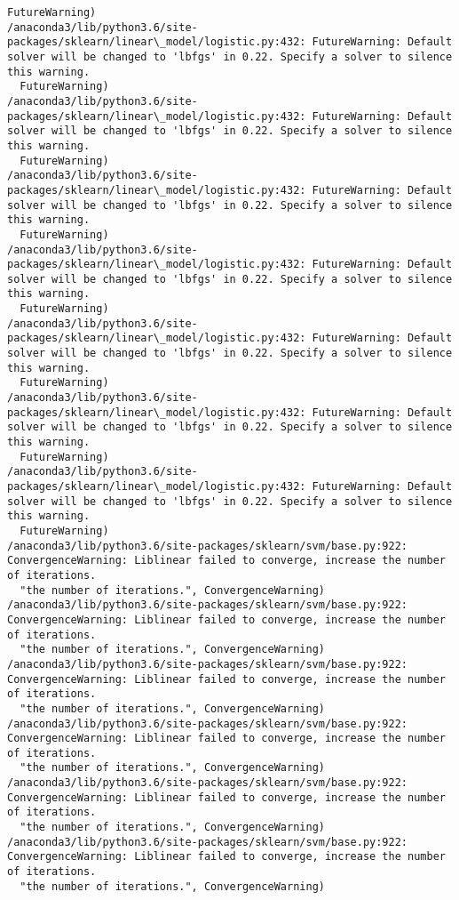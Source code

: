 \documentclass[11pt]{article}
\begin{document}
\begin{Verbatim}[commandchars=\\\{\}]
  FutureWarning)
/anaconda3/lib/python3.6/site-packages/sklearn/linear\_model/logistic.py:432: FutureWarning: Default solver will be changed to 'lbfgs' in 0.22. Specify a solver to silence this warning.
  FutureWarning)
/anaconda3/lib/python3.6/site-packages/sklearn/linear\_model/logistic.py:432: FutureWarning: Default solver will be changed to 'lbfgs' in 0.22. Specify a solver to silence this warning.
  FutureWarning)
/anaconda3/lib/python3.6/site-packages/sklearn/linear\_model/logistic.py:432: FutureWarning: Default solver will be changed to 'lbfgs' in 0.22. Specify a solver to silence this warning.
  FutureWarning)
/anaconda3/lib/python3.6/site-packages/sklearn/linear\_model/logistic.py:432: FutureWarning: Default solver will be changed to 'lbfgs' in 0.22. Specify a solver to silence this warning.
  FutureWarning)
/anaconda3/lib/python3.6/site-packages/sklearn/linear\_model/logistic.py:432: FutureWarning: Default solver will be changed to 'lbfgs' in 0.22. Specify a solver to silence this warning.
  FutureWarning)
/anaconda3/lib/python3.6/site-packages/sklearn/linear\_model/logistic.py:432: FutureWarning: Default solver will be changed to 'lbfgs' in 0.22. Specify a solver to silence this warning.
  FutureWarning)
/anaconda3/lib/python3.6/site-packages/sklearn/linear\_model/logistic.py:432: FutureWarning: Default solver will be changed to 'lbfgs' in 0.22. Specify a solver to silence this warning.
  FutureWarning)
/anaconda3/lib/python3.6/site-packages/sklearn/svm/base.py:922: ConvergenceWarning: Liblinear failed to converge, increase the number of iterations.
  "the number of iterations.", ConvergenceWarning)
/anaconda3/lib/python3.6/site-packages/sklearn/svm/base.py:922: ConvergenceWarning: Liblinear failed to converge, increase the number of iterations.
  "the number of iterations.", ConvergenceWarning)
/anaconda3/lib/python3.6/site-packages/sklearn/svm/base.py:922: ConvergenceWarning: Liblinear failed to converge, increase the number of iterations.
  "the number of iterations.", ConvergenceWarning)
/anaconda3/lib/python3.6/site-packages/sklearn/svm/base.py:922: ConvergenceWarning: Liblinear failed to converge, increase the number of iterations.
  "the number of iterations.", ConvergenceWarning)
/anaconda3/lib/python3.6/site-packages/sklearn/svm/base.py:922: ConvergenceWarning: Liblinear failed to converge, increase the number of iterations.
  "the number of iterations.", ConvergenceWarning)
/anaconda3/lib/python3.6/site-packages/sklearn/svm/base.py:922: ConvergenceWarning: Liblinear failed to converge, increase the number of iterations.
  "the number of iterations.", ConvergenceWarning)

\end{Verbatim}
\end{document}
